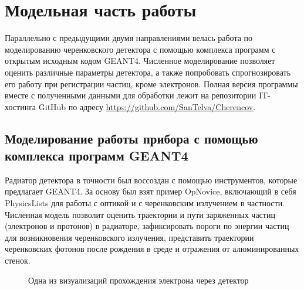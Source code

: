 \documentclass[12pt,a4paper]{report} %
\begin{document}
\chapter{Модельная часть работы}
Параллельно с предыдущими двумя направлениями велась работа по моделированию черенковского детектора с помощью комплекса программ с открытым исходным кодом GEANT4. Численное моделирование позволяет оценить различные параметры детектора, а также попробовать спрогнозировать его работу при регистрации частиц, кроме электронов. Полная версия программы вместе с полученными данными для обработки лежит на репозитории IT-хостинга GitHub по адресу \url{https://github.com/SanTelva/Cherencov}.

\section{Моделирование работы прибора с помощью комплекса программ GEANT4}
Радиатор детектора в точности был воссоздан с помощью инструментов, которые предлагает GEANT4. За основу был взят пример OpNovice, включающий в себя PhysicsLists для работы с оптикой и с черенковским излучением в частности. Численная модель позволит оценить траектории и пути заряженных частиц (электронов и протонов) в радиаторе, зафиксировать пороги по энергии частиц для возникновения черенковского излучения, представить траектории черенковских фотонов после рождения в среде и отражения от алюминированных стенок. 
\begin{figure}[t]
	\caption{Одна из визуализаций прохождения электрона через детектор}
	\label{model}	
\end{figure}
\end{document}
